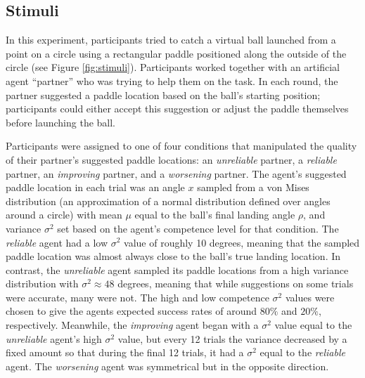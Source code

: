 \documentclass[10pt,letterpaper]{article}
\begin{document}
\subsection{Stimuli}

In this experiment, participants tried to catch a virtual ball launched from a point on a circle using a rectangular paddle positioned along the outside of the circle (see Figure \ref{fig:stimuli}).\footnotemark{} 
Participants worked together with an artificial agent ``partner'' who was trying to help them on the task. In each round, the partner suggested a paddle location based on the ball's starting position; participants could either accept this suggestion or adjust the paddle themselves before launching the ball.


Participants were assigned to one of four conditions that manipulated the quality of their partner's suggested paddle locations: an \textit{unreliable} partner, a \textit{reliable} partner, an \textit{improving} partner, and a \textit{worsening} partner. The agent's
suggested paddle location in each trial was an angle $x$ sampled from a von Mises distribution (an approximation of a normal distribution defined over angles around a circle) with mean $\mu$ equal to the ball's final landing angle $\rho$, and variance $\sigma^2$ set based on the agent's competence level for that condition. The \textit{reliable} agent had a low $\sigma^2$ value of roughly 10 degrees, meaning that the sampled paddle location was almost always close to the ball's true landing location. In contrast, the \textit{unreliable} agent sampled its paddle locations from a high variance distribution with $\sigma^2 \approx 48$ degrees, meaning that while suggestions on some trials were accurate, many were not. The high and low competence $\sigma^2$ values were chosen to give the agents expected success rates of around $80\%$ and $20\%$, respectively. Meanwhile, the \textit{improving} agent began with a $\sigma^2$ value equal to the \textit{unreliable} agent's high $\sigma^2$ value, but every 12 trials the variance decreased by a fixed amount so that during the final 12 trials, it had a $\sigma^2$ equal to the \textit{reliable} agent. The \textit{worsening} agent was symmetrical but in the opposite direction.
\end{document}
